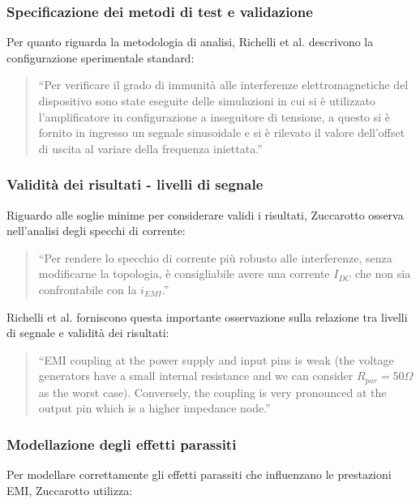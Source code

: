 \subsubsection{Specificazione dei metodi di test e validazione}

Per quanto riguarda la metodologia di analisi, Richelli et al. \cite{TR2016} descrivono la configurazione sperimentale standard:

\begin{quote}
``Per verificare il grado di immunità alle interferenze elettromagnetiche del dispositivo sono state eseguite delle simulazioni in cui si è utilizzato l'amplificatore in configurazione a inseguitore di tensione, a questo si è fornito in ingresso un segnale sinusoidale e si è rilevato il valore dell'offset di uscita al variare della frequenza iniettata.''
\end{quote}

\subsubsection{Validità dei risultati - livelli di segnale}

Riguardo alle soglie minime per considerare validi i risultati, Zuccarotto \cite{tesi} osserva nell'analisi degli specchi di corrente:

\begin{quote}
``Per rendere lo specchio di corrente più robusto alle interferenze, senza modificarne la topologia, è consigliabile avere una corrente $I_{DC}$ che non sia confrontabile con la $i_{EMI}$.''
\end{quote}

Richelli et al. \cite{TR2016} forniscono questa importante osservazione sulla relazione tra livelli di segnale e validità dei risultati:

\begin{quote}
``EMI coupling at the power supply and input pins is weak (the voltage generators have a small internal resistance and we can consider $R_{par} = 50\Omega$ as the worst case). Conversely, the coupling is very pronounced at the output pin which is a higher impedance node.''
\end{quote}

\subsubsection{Modellazione degli effetti parassiti}

Per modellare correttamente gli effetti parassiti che influenzano le prestazioni EMI, Zuccarotto \cite{tesi} utilizza:

